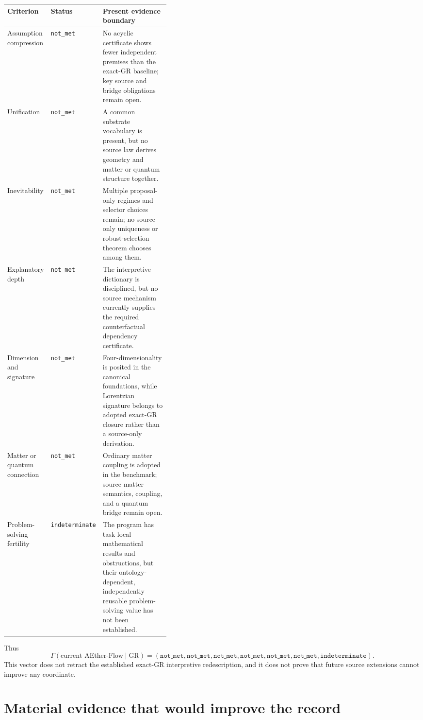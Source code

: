 \documentclass[11pt]{article}
\newcommand{\NotMet}{\texttt{not\_met}}
\newcommand{\Indet}{\texttt{indeterminate}}
\begin{document}
\begin{center}
\small
\begin{tabularx}{\textwidth}{>{\raggedright\arraybackslash}p{0.25\linewidth}
  >{\raggedright\arraybackslash}p{0.14\linewidth}
  >{\raggedright\arraybackslash}X}
\toprule
Criterion & Status & Present evidence boundary \\
\midrule
Assumption compression & \NotMet & No acyclic certificate shows fewer independent premises than the exact-GR baseline; key source and bridge obligations remain open. \\
Unification & \NotMet & A common substrate vocabulary is present, but no source law derives geometry and matter or quantum structure together. \\
Inevitability & \NotMet & Multiple proposal-only regimes and selector choices remain; no source-only uniqueness or robust-selection theorem chooses among them. \\
Explanatory depth & \NotMet & The interpretive dictionary is disciplined, but no source mechanism currently supplies the required counterfactual dependency certificate. \\
Dimension and signature & \NotMet & Four-dimensionality is posited in the canonical foundations, while Lorentzian signature belongs to adopted exact-GR closure rather than a source-only derivation. \\
Matter or quantum connection & \NotMet & Ordinary matter coupling is adopted in the benchmark; source matter semantics, coupling, and a quantum bridge remain open. \\
Problem-solving fertility & \Indet & The program has task-local mathematical results and obstructions, but their ontology-dependent, independently reusable problem-solving value has not been established. \\
\bottomrule
\end{tabularx}
\end{center}

Thus
\[
\Gamma(\text{current AEther-Flow}\mid\text{GR})
=(\NotMet,\NotMet,\NotMet,\NotMet,\NotMet,\NotMet,\Indet).
\]
This vector does not retract the established exact-GR interpretive
redescription, and it does not prove that future source extensions cannot
improve any coordinate.

\section{Material evidence that would improve the record}
\end{document}
